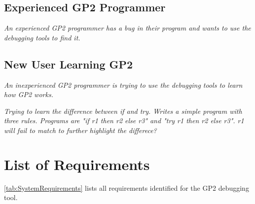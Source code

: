 \documentclass[authoryearcitations]{UoYCSproject}
\begin{document}

\subsection{Experienced GP2 Programmer}

\emph{An experienced GP2 programmer has a bug in their program and wants to use
the debugging tools to find it.}


\subsection{New User Learning GP2}

\emph{An inexperienced GP2 programmer is trying to use the debugging tools to
learn how GP2 works.}

\emph{Trying to learn the difference between if and try. Writes a simple program
with three rules. Programs are "if r1 then r2 else r3" and "try r1 then r2 else r3".
r1 will fail to match to further highlight the differece?}


\section{List of Requirements}
\label{sec:ListOfRequirements}

\autoref{tab:SystemRequirements} lists all requirements identified for the GP2
debugging tool.
\end{document}
